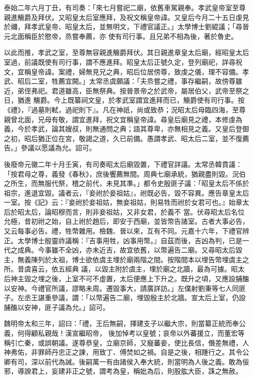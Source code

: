 \begin{pinyinscope}
 泰始二年六月丁丑，有司奏：「來七月嘗祀二廟，依舊車駕親奉。孝武皇帝室至尊親進觴爵及拜伏。又昭皇太后室應拜，及祝文稱皇帝諱。又皇后今月二十五日虔見於禰，拜孝武皇帝、昭皇太后，並無明文，下禮官議正。」太學博士劉緄議；「尋晉元北面稱臣於愍帝，烝嘗奉薦，亦
 使有司行事。且兄弟不相為後，著於魯史。



 以此而推，孝武之室，至尊無容親進觴爵拜伏。其日親進章皇太后廟，經昭皇太后室過，前議既使有司行事，謂不應進拜。昭皇太后正號久定，登列廟祀，詳尋祝文，宜稱皇帝諱。案禮，婦無見兄之典，昭后位居傍尊，致虔之儀，理不容備。孝武、昭后二室，牲薦宜闕。」太常丞虞願議：「夫烝嘗之禮，事存繼嗣，故傍尊雖近，弟侄弗祀。君道雖高，臣無祭典。按晉景帝之於武帝，屬居伯父，武帝至祭之日，猶進
 觴爵。今上既纂祠文皇，於孝武室謂宜進拜而已，觴爵使有司行事。按《禮》，『過墓則軾，過祀則下』。凡在神祇，尚或致恭；況昭太后母臨四海，至尊親曾北面，兄母有敬，謂宜進拜，祝文宜稱皇帝諱。尋皇后廟見之禮，本修虔為義，今於孝武，論其嫂叔，則無通問之典；語其尊卑，亦無相見之義。又皇后登御之初，昭后猶正位在宮，敬謁之道，久已前備。愚謂孝武、昭太后二室，並不復薦告。」參議以愿議為允。詔可。



 後廢帝元徽二年十月壬寅，有司奏昭太后廟毀置，下禮官詳議。太常丞韓賁議：「按君母之尊，義發《春秋》，庶後饗薦無間。周典七廟承統，猶親盡則毀。況伯之所生，而無服代祭，稽之前代，未見其準。」都令史殷匪子議：「昭皇太后不係於祖宗，進退宜毀。議者云，『妾祔於妾祖姑』，祔既必告，毀不容異。應告章皇太后一室。按《記》云：『妾祔於妾祖姑，無妾祖姑，則易牲而祔於女君可也。』始章太后於昭太后，論昭穆而言，則非妾祖姑，又非女君，於義不
 當。伏尋昭太后名位允極，昔初祔之始，自上祔於趙后，即安于西廟，並皆幣告諸室。古者大事必告，又云每事必告。禮，牲幣雜用。檢魏、晉以來，互有不同。元嘉十六年，下禮官辨正。太學博士殷靈祚議稱：『吉事用牲，凶事用幣。』自茲而後，吉凶為判，已是一代之成典。今事雖不全凶，亦未近吉，故宜依舊，以幣遍告二廟。又尋昭太后毀主，無義陳列於太祖，博士欲依虞主埋於廟兩階之間。按階間本以埋告幣埋虞主之所。昔虞喜云，依五經典
 議，以毀主附於虞主，埋於廟之北牆，最為可據。昭太后神主毀之埋之後，上室不可不虛置，太后便應上下升之。既升之頃，又應設脯醢以安神。今禮官所議，謬略未周。遷毀事大，請廣詳訪。」左僕射劉秉等七人同匪子。左丞王諶重參議，謂：「以幣遍告二廟，埋毀殷主於北牆。宣太后上室，仍設脯醢以安神，匪子議為允。」詔可。



 魏明帝太和三年，詔曰：「禮，王后無嗣，擇建支子以繼大宗，則當纂正統而奉公義，何得顧私親哉！漢宣繼昭帝，
 後加悼考以皇號；哀帝以外蕃援立，而董宏等稱引亡秦，或誤朝議。遂尊恭皇，立廟京師，又寵蕃妾，使比長信，僭差無禮，人神弗佑，非罪師丹忠正之諫，用致丁、傅焚如之禍。自是之後，相踵行之。其令公卿有司，深以前代為誡。後嗣萬一有由諸侯入奉大統，則當明為人後之義。敢為佞邪，導諛君上，妄建非正之號，謂考為皇，稱妣為后，則股肱大臣，誅之無赦。




\end{pinyinscope}
